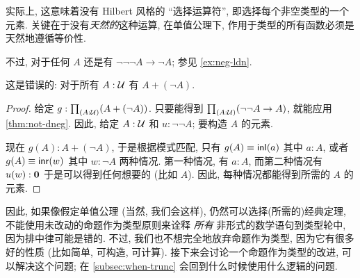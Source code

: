 \begin{rmk}
    实际上, 这意味着没有 Hilbert 风格的 ``选择运算符'', 即选择每个非空类型的一个元素.
    关键在于没有\emph{天然的}这种运算, 在单值公理下, 作用于类型的所有函数必须是天然地遵循等价性.
\end{rmk}

\begin{rmk}
    不过, 对于任何 $A$ 还是有 $\neg\neg\neg A \to \neg A$; 参见 \cref{ex:neg-ldn}.
\end{rmk}

\begin{cor}
    \label{thm:not-lem}
    这是错误的: 对于所有 $A:\mathcal{U}$ 有 $A+(\neg A)$.
\end{cor}
\begin{proof}
    给定 $g:\prd{A:\UU} (A+(\neg A))$.
    只要能得到 $\prd{A:\UU} (\neg\neg A \to A)$, 就能应用 \cref{thm:not-dneg}.
    因此, 给定 $A:\mathcal{U}$ 和 $u:\neg\neg A$;
    要构造 $A$ 的元素.

    现在 $g(A):A+(\neg A)$, 于是根据模式匹配, 只有 $g(A)\equiv {\mathsf{inl}}(a)$ 其中 $a:A$, 或者 $g(A)\equiv {\mathsf{inr}}(w)$ 其中 $w:\neg A$ 两种情况.
    第一种情况, 有 $a:A$, 而第二种情况有 $u(w):\mathbf{0}$ 于是可以得到任何想要的 (比如 $A$).
    因此, 每种情况都能得到所需的 $A$ 的元素.
\end{proof}

因此, 如果像假定单值公理 (当然, 我们会这样), 仍然可以选择(所需的)经典定理, 不能使用未改动的命题作为类型原则来诠释 \emph{所有} 非形式的数学语句到类型轮中, 因为排中律可能是错的.
不过, 我们也不想完全地放弃命题作为类型, 因为它有很多好的性质 (比如简单, 可构造, 可计算).
接下来会讨论一个命题作为类型的改进, 可以解决这个问题;
在 \cref{subsec:when-trunc} 会回到什么时候使用什么逻辑的问题.
%
%
%
